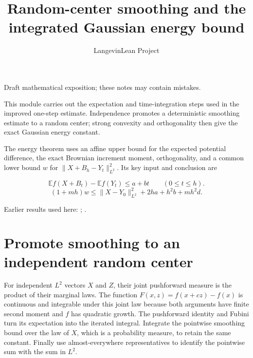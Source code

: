 \documentclass[11pt,a4paper]{article}
\title{\texorpdfstring{Random-center smoothing and the integrated Gaussian energy bound}{Random-center smoothing and the integrated Gaussian energy bound}}
\author{LangevinLean Project}
\date{}
\begin{document}
\maketitle
Draft mathematical exposition; these notes may contain mistakes.


This module carries out the expectation and time-integration steps used in the improved one-step estimate. Independence promotes a deterministic smoothing estimate to a random center; strong convexity and orthogonality then give the exact Gaussian energy constant.



The energy theorem uses an affine upper bound for the expected potential difference, the exact Brownian increment moment, orthogonality, and a common lower bound \(w\) for \(\|X+B_h-Y_t\|_{L^2}^2\). Its key input and conclusion are


\[\mathbb Ef(X+B_t)-\mathbb Ef(Y_t)\le a+bt\qquad(0\le t\le h).\]
\[(1+mh)w\le\|X-Y_0\|_{L^2}^{2}+2ha+h^2b+mh^2d.\]

Earlier results used here: \cite[Section~3.18]{LangevinLean2026Proximal}; \cite[Section~3.45]{LangevinLean2026ULASC}.

\section{\texorpdfstring{Promote smoothing to an independent random center}{Promote smoothing to an independent random center}}


For independent \(L^{2}\) vectors \(X\) and \(Z\), their joint pushforward measure is the product of their marginal laws. The function \(F(x,z)=f(x+cz)-f(x)\) is continuous and integrable under this joint law because both arguments have finite second moment and \(f\) has quadratic growth. The pushforward identity and Fubini turn its expectation into the iterated integral. Integrate the pointwise smoothing bound over the law of \(X\), which is a probability measure, to retain the same constant. Finally use almost-everywhere representatives to identify the pointwise sum with the sum in \(L^{2}\).
\end{document}
